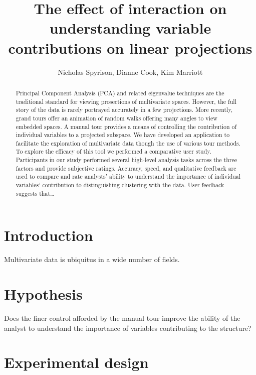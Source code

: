 \documentclass[]{article}
\title{The effect of interaction on understanding variable contributions on
linear projections}
\author{Nicholas Spyrison, Dianne Cook, Kim Marriott}
\date{}
\begin{document}
\maketitle
\begin{abstract}
Principal Component Analysis (PCA) and related eigenvalue techniques are
the traditional standard for viewing prosections of multivariate spaces.
However, the full story of the data is rarely portrayed accurately in a
few projections. More recently, grand tours offer an animation of random
walks offering many angles to view embedded spaces. A manual tour
provides a means of controlling the contribution of individual variables
to a projected subspace. We have developed an application to facilitate
the exploration of multivariate data though the use of various tour
methods. To explore the efficacy of this tool we performed a comparative
user study. Participants in our study performed several high-level
analysis tasks across the three factors and provide subjective ratings.
Accuracy, speed, and qualitative feedback are used to compare and rate
analysts' ability to understand the importance of individual variables'
contribution to distinguishing clustering with the data. User feedback
suggests that\ldots{}
\end{abstract}



\hypertarget{introduction}{%
\section{Introduction}\label{introduction}}

Multivariate data is ubiquitus in a wide number of fields.

\hypertarget{hypothesis}{%
\section{Hypothesis}\label{hypothesis}}

Does the finer control afforded by the manual tour improve the ability
of the analyst to understand the importance of variables contributing to
the structure?

\hypertarget{sec:design}{%
\section{Experimental design}\label{sec:design}}
\end{document}
